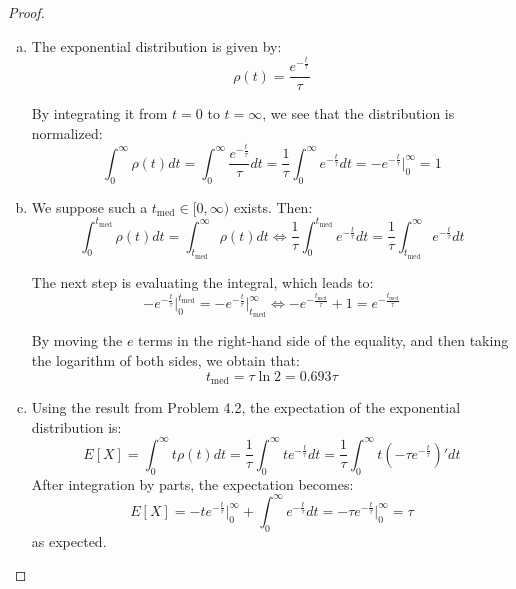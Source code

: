 \begin{proof}
\hfill

    \begin{enumerate}[(a)]
        \item The exponential distribution is given by:
            \begin{equation*}\tag{4.27}
                \rho(t) = \frac{e^{-\frac{t}{\tau}}}{\tau}
            \end{equation*}

        By integrating it from $t = 0$ to $t = \infty$, we see that the distribution is
        normalized:
        \[
            \int_{0}^{\infty} \rho(t) dt
            = \int_{0}^{\infty} \frac{e^{-\frac{t}{\tau}}}{\tau} dt
            = \frac{1}{\tau} \int_{0}^{\infty} e^{-\frac{t}{\tau}} dt
            = -e^{-\frac{t}{\tau}}\bigg|_{0}^{\infty} 
            = 1
        \] 

        \item We suppose such a $t_{\text{med}} \in [0, \infty)$ exists. Then:
            \[
                \int_{0}^{t_\text{med}} \rho(t) dt = \int_{t_\text{med}}^{\infty} \rho(t) dt 
                \iff \frac{1}{\tau}\int_0^{t_\text{med}} e^{-\frac{t}{\tau}} dt
                    = \frac{1}{\tau}\int_{t_\text{med}}^\infty e^{-\frac{t}{\tau}} dt
            \] 

        The next step is evaluating the integral, which leads to:
        \[
            -e^{-\frac{t}{\tau}}\bigg|_{0}^{t_\text{med}} 
            = -e^{-\frac{t}{\tau}}\bigg|_{t_\text{med}}^{\infty} 
            \iff -e^{-\frac{t_\text{med}}{\tau}} + 1 = e^{-\frac{t_\text{med}}{\tau}}
        \] 

        By moving the $e$ terms in the right-hand side of the equality, and then
        taking the logarithm of both sides, we obtain that:
        \[
            t_\text{med} = \tau \ln 2 = 0.693 \tau
        \]

        \item Using the result from Problem 4.2, the expectation of the exponential
            distribution is:
            \[
                E[X] = \int_{0}^{\infty} t \rho(t) dt 
                = \frac{1}{\tau}\int_{0}^{\infty} t e^{-\frac{t}{\tau}} dt
                = \frac{1}{\tau}\int_{0}^{\infty} t (-\tau e^{-\frac{t}{\tau}})' dt
            \] 
        After integration by parts, the expectation becomes:
        \[
            E[X] = -te^{-\frac{t}{\tau}}\bigg|_{0}^{\infty} + \int_0^\infty e^{-\frac{t}{\tau}} dt
            = -\tau e^{-\frac{t}{\tau}} \bigg|_{0}^{\infty} = \tau
        \] 
        as expected.


\end{enumerate}
\end{proof}
